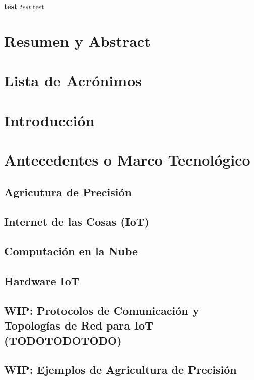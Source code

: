\documentclass[11pt]{article}
\begin{document}
\section*{}
\textbf{test}
\emph{test}
\underline{test}
\newpage

\section*{Resumen y Abstract}

\newpage

\tableofcontents{}
\newpage

\section*{Lista de Acrónimos}

\newpage

\section{Introducción}

\section{Antecedentes o Marco Tecnológico}
\subsection{Agricutura de Precisión}
\subsection{Internet de las Cosas (IoT)}
\subsection{Computación en la Nube}
\subsection{Hardware IoT}
\subsection{WIP: Protocolos de Comunicación y Topologías de Red para IoT (TODOTODOTODO)}
\subsection{WIP: Ejemplos de Agricultura de Precisión}
\end{document}
